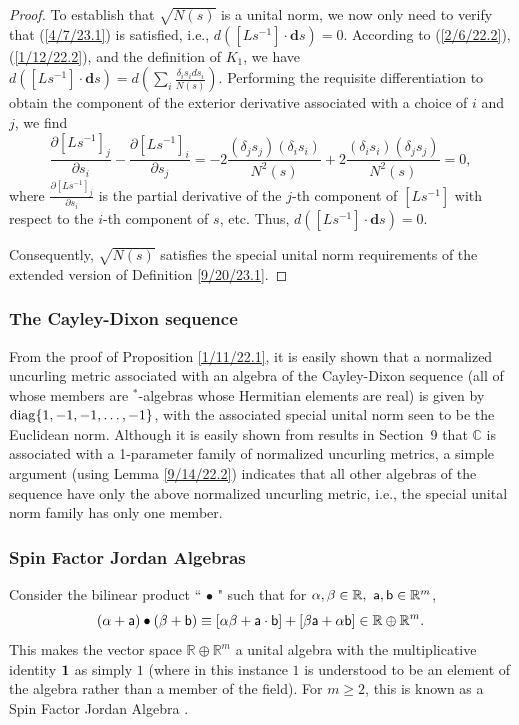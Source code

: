 \documentclass{amsart}
\numberwithin{equation}{section}
\theoremstyle{definition}
\numberwithin{theorem}{section}
\begin{document}
\begin{proof}
 To establish that $\sqrt{N(s)}$ is a unital norm, we  now only need to verify that (\ref{4/7/23.1}) is satisfied, i.e., $d\left([Ls^{-1}]\cdot \mathbf{d}s\right)=0$.  According to (\ref{2/6/22.2}), (\ref{1/12/22.2}), and the definition  of $K_1$, we have $d\left([Ls^{-1}]\cdot \mathbf{d}s\right) = d\left(\sum_i \frac{\delta_is_i ds_i}{N(s)}\right)$.  Performing the requisite differentiation to obtain the component of the exterior derivative associated with a choice of $i$ and $j$, we find \[ \frac{\partial [Ls^{-1}]_j}{\partial s_i} - \frac{\partial [Ls^{-1}]_i}{\partial s_j} = -2\frac{(\delta_j s_j)(\delta_i s_i)}{N^2(s)} +
2\frac{(\delta_i s_i)(\delta_j s_j)}{N^2(s)} = 0,  \] where $\frac{\partial [Ls^{-1}]_j}{\partial s_i}$ is the partial derivative of the $j$-th component of $[Ls^{-1}]$ with respect to the $i$-th component of $s$, etc. Thus,  $d\left([Ls^{-1}]\cdot \mathbf{d}s\right) = 0$.

Consequently, $\sqrt{N(s)}$ satisfies the special unital norm requirements of the extended version of Definition \ref{9/20/23.1}.  
\end{proof}


\subsubsection{The Cayley-Dixon sequence}  From the proof of Proposition \ref{1/11/22.1}, it is easily shown that a normalized uncurling metric associated with an algebra of the Cayley-Dixon sequence (all of whose members are $^*$-algebras whose Hermitian elements are real) is given by ${\rm diag}\{1,-1,-1,\dots,-1\}$, with the associated special unital norm seen to be the Euclidean norm. Although it is easily shown from results in \mbox{Section 9} that $\mathbb{C}$ is associated with a 1-parameter family of normalized uncurling metrics, a simple argument (using Lemma \ref{9/14/22.2}) indicates that all other algebras of the sequence have only the above normalized uncurling metric, i.e., the special unital norm family has only one member.  
 
\subsubsection{Spin Factor Jordan Algebras}  Consider the bilinear product ``$\,\bullet\,$" such that for
$\alpha,\beta\in \mathbb{R},\,\, {\sf a},{\sf b}\in \mathbb{R}^m$,  \begin{equation}  (\alpha+ {\sf a})\bullet (\beta + {\sf b}) \equiv
    [\alpha \beta + {\sf a} \cdot {\sf b}] + [ \beta {\sf a} + \alpha {\sf b}] \in \mathbb{R}\oplus \mathbb{R}^m. \label{12/24/18.1}\end{equation}  This makes the vector space $\mathbb{R}\oplus \mathbb{R}^m$ a unital algebra with the multiplicative identity ${\bf 1}$ as simply $1$ (where in this instance $1$ is understood to be an element of the algebra rather than a member of the field).  For $m\ge 2$, this is known as a Spin Factor Jordan Algebra \cite{mccrimmon:2004}.
\end{document}
